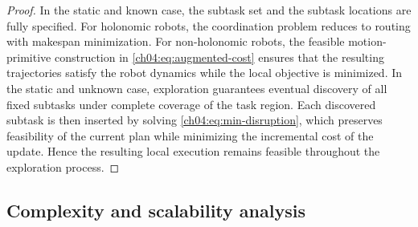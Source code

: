 \begin{proof}
In the static and known case, the subtask set and the subtask locations are
fully specified. For holonomic robots, the coordination problem reduces to
routing with makespan minimization. For non-holonomic robots, the feasible
motion-primitive construction in \eqref{ch04:eq:augmented-cost} ensures that
the resulting trajectories satisfy the robot dynamics while the local objective
is minimized.
In the static and unknown case, exploration guarantees eventual discovery of
all fixed subtasks under complete coverage of the task region. Each discovered
subtask is then inserted by solving \eqref{ch04:eq:min-disruption}, which
preserves feasibility of the current plan while minimizing the incremental cost
of the update. Hence the resulting local execution remains feasible throughout
the exploration process.
\end{proof}

\subsection{Complexity and scalability analysis}\label{ch04:subsubsec:complexity}

